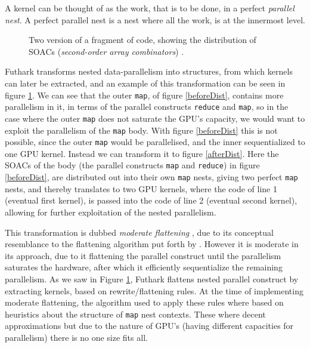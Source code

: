 A kernel can be thought of as the work, that is to be done, in a perfect \textit{parallel nest}. A perfect parallel nest is a nest where all the work, is at the innermost level. 
\begin{figure}[h]
\centering
	\hspace{2cm}
	\caption{Two version of a fragment of code, showing the distribution of SOACs (\textit{second-order array combinators}) \cite{futhark-moderate-blog}.}
	\label{loopDist}
\end{figure}
\noindent Futhark transforms nested data-parallelism into structures, from
which kernels can later be extracted, and an example of this transformation can
be seen in figure \ref{loopDist}. We can see that the outer \texttt{map}, of
figure \ref{beforeDist}, contains more parallelism in it, in terms of the
parallel constructs \texttt{reduce} and \texttt{map}, so in the case where the
outer \texttt{map} does not saturate the GPU's capacity, we would want to
exploit the parallelism of the \texttt{map} body. With figure \ref{beforeDist}
this is not possible, since the outer \texttt{map} would be parallelised, and
the inner sequentialized to one GPU kernel. Instead we can transform it to
figure \ref{afterDist}. Here the SOACs of the body (the parallel constructs
\texttt{map} and \texttt{reduce}) in figure \ref{beforeDist}, are distributed out into their own \texttt{map} nests, giving two perfect \texttt{map} nests, and thereby translates to two GPU kernels, where the code of line 1 (eventual first kernel), is passed into the code of line 2 (eventual second kernel), allowing for further exploitation of the nested parallelism.

This transformation is dubbed \textit{moderate flattening} \cite{futhark-nested-para}, due to its conceptual resemblance to the flattening algorithm put forth by \citeauthor{flat} \cite{flat}. However it is moderate in its approach, due to it flattening the parallel construct until the parallelism saturates the hardware, after which it efficiently sequentialize the remaining parallelism. As we saw in Figure \ref{loopDist}, Futhark flattens nested parallel construct by extracting kernels, based on rewrite/flattening rules. At the time of implementing moderate flattening, the algorithm used to apply these rules where based on heuristics about the structure of \texttt{map} nest contexts. These where decent approximations but due to the nature of GPU's (having different capacities for parallelism) there is no one size fits all. 

